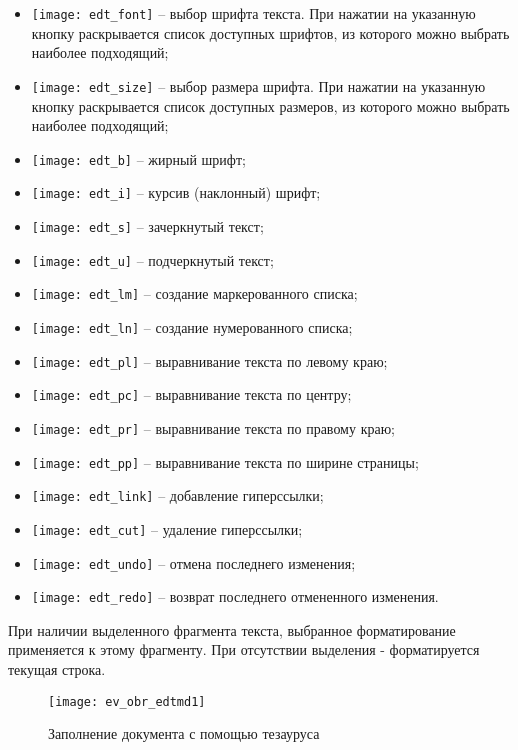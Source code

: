 \begin{enumerate}
 \begin{itemize}
  \item \texttt{[image: edt\_font]} -- выбор шрифта текста. При нажатии на указанную кнопку раскрывается список доступных шрифтов, из которого можно выбрать наиболее подходящий;
  \item \texttt{[image: edt\_size]} -- выбор размера шрифта. При нажатии на указанную кнопку раскрывается список доступных размеров, из которого можно выбрать наиболее подходящий; 
  \item \texttt{[image: edt\_b]} -- жирный шрифт; 
  \item \texttt{[image: edt\_i]} -- курсив (наклонный) шрифт;
  \item \texttt{[image: edt\_s]} -- зачеркнутый текст; 
  \item \texttt{[image: edt\_u]} -- подчеркнутый текст;
  \item \texttt{[image: edt\_lm]} -- создание маркерованного списка;
  \item \texttt{[image: edt\_ln]} -- создание нумерованного списка;
  \item \texttt{[image: edt\_pl]} -- выравнивание текста по левому краю;
  \item \texttt{[image: edt\_pc]} -- выравнивание текста по центру;
  \item \texttt{[image: edt\_pr]} -- выравнивание текста по правому краю;
  \item \texttt{[image: edt\_pp]} -- выравнивание текста по ширине страницы; 
  \item \texttt{[image: edt\_link]} -- добавление гиперссылки;
  \item \texttt{[image: edt\_cut]} -- удаление гиперссылки;
  \item \texttt{[image: edt\_undo]} -- отмена последнего изменения;
  \item \texttt{[image: edt\_redo]} -- возврат последнего отмененного изменения.      
 \end{itemize}
 
 При наличии выделенного фрагмента текста, выбранное форматирование применяется к этому фрагменту. При отсутствии выделения - форматируется текущая строка.
 
 \begin{figure}[ht!]\centering
  \texttt{[image: ev\_obr\_edtmd1]}
  \caption{Заполнение документа с помощью тезауруса}
  \label{img_ev_obr_edtmd1}
 \end{figure}
 

\end{enumerate}
